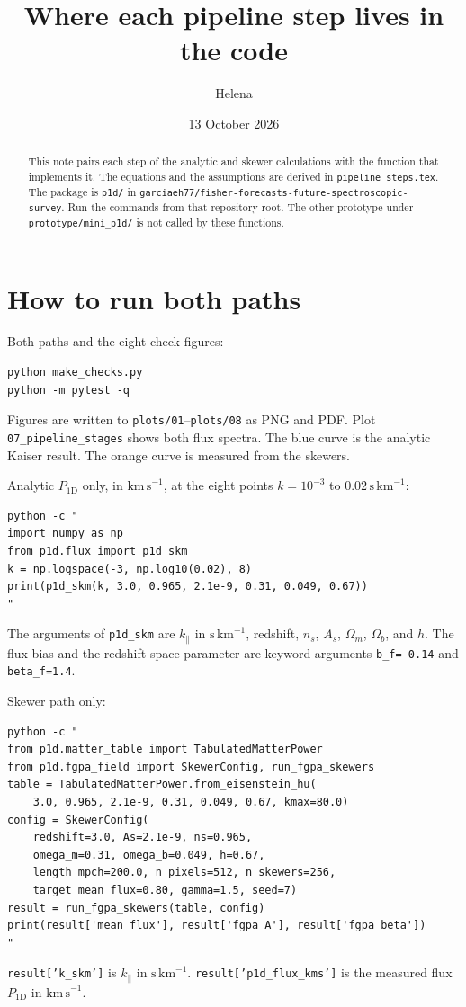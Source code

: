 \documentclass[11pt]{article}
\title{Where each pipeline step lives in the code}
\author{Helena}
\date{13 October 2026}
\begin{document}
\maketitle

\begin{abstract}
This note pairs each step of the analytic and skewer calculations with the function that implements it. The equations and the assumptions are derived in \texttt{pipeline\_steps.tex}. The package is \texttt{p1d/} in \texttt{garciaeh77/fisher-forecasts-future-spectroscopic-survey}. Run the commands from that repository root. The other prototype under \texttt{prototype/mini\_p1d/} is not called by these functions.
\end{abstract}

\section{How to run both paths}

Both paths and the eight check figures:
\begin{verbatim}
python make_checks.py
python -m pytest -q
\end{verbatim}
Figures are written to \texttt{plots/01}--\texttt{plots/08} as PNG and PDF. Plot \texttt{07\_pipeline\_stages} shows both flux spectra. The blue curve is the analytic Kaiser result. The orange curve is measured from the skewers.

Analytic $P_{1\mathrm{D}}$ only, in $\mathrm{km\,s}^{-1}$, at the eight points $k=10^{-3}$ to $0.02\,\mathrm{s\,km}^{-1}$:
\begin{verbatim}
python -c "
import numpy as np
from p1d.flux import p1d_skm
k = np.logspace(-3, np.log10(0.02), 8)
print(p1d_skm(k, 3.0, 0.965, 2.1e-9, 0.31, 0.049, 0.67))
"
\end{verbatim}
The arguments of \texttt{p1d\_skm} are $k_\parallel$ in $\mathrm{s\,km}^{-1}$, redshift, $n_s$, $A_s$, $\Omega_m$, $\Omega_b$, and $h$. The flux bias and the redshift-space parameter are keyword arguments \texttt{b\_f=-0.14} and \texttt{beta\_f=1.4}.

Skewer path only:
\begin{verbatim}
python -c "
from p1d.matter_table import TabulatedMatterPower
from p1d.fgpa_field import SkewerConfig, run_fgpa_skewers
table = TabulatedMatterPower.from_eisenstein_hu(
    3.0, 0.965, 2.1e-9, 0.31, 0.049, 0.67, kmax=80.0)
config = SkewerConfig(
    redshift=3.0, As=2.1e-9, ns=0.965,
    omega_m=0.31, omega_b=0.049, h=0.67,
    length_mpch=200.0, n_pixels=512, n_skewers=256,
    target_mean_flux=0.80, gamma=1.5, seed=7)
result = run_fgpa_skewers(table, config)
print(result['mean_flux'], result['fgpa_A'], result['fgpa_beta'])
"
\end{verbatim}
\texttt{result['k\_skm']} is $k_\parallel$ in $\mathrm{s\,km}^{-1}$. \texttt{result['p1d\_flux\_kms']} is the measured flux $P_{1\mathrm{D}}$ in $\mathrm{km\,s}^{-1}$.
\end{document}
